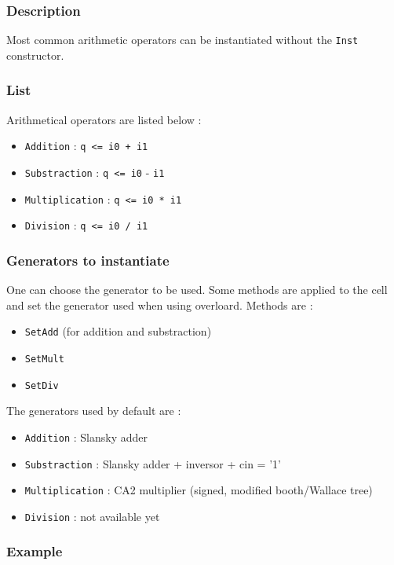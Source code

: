  \subsubsection{Description}

Most common arithmetic operators can be instantiated without the \verb-Inst- constructor.

\subsubsection{List}

Arithmetical operators are listed below :
\begin{itemize}
    \item \verb-Addition- : \verb-q <= i0 + i1-
    \item \verb-Substraction- : \verb-q <= i0- - \verb-i1-
    \item \verb-Multiplication- : \verb-q <= i0 * i1-
    \item \verb-Division- : \verb-q <= i0 / i1-
\end{itemize}

\subsubsection{Generators to instantiate}

One can choose the generator to be used. Some methods are applied to the cell and set the generator used when using overloard.
\indent Methods are :
\begin{itemize}
    \item \verb-SetAdd- (for addition and substraction)
    \item \verb-SetMult-
    \item \verb-SetDiv-
\end{itemize}

\indent The generators used by default are :
\begin{itemize}
    \item \verb-Addition- : Slansky adder
    \item \verb-Substraction- : Slansky adder + inversor + cin = '1'
    \item \verb-Multiplication- : CA2 multiplier (signed, modified booth/Wallace tree)
    \item \verb-Division- : not available yet
\end{itemize}

\subsubsection{Example}

